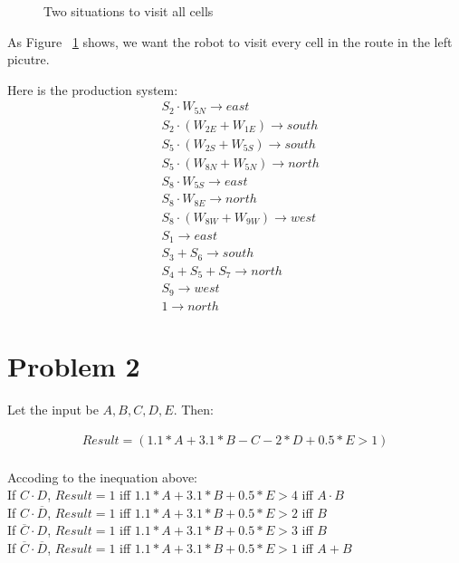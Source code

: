 \documentclass[paper=a4, fontsize=11pt]{scrartcl} %
\numberwithin{equation}{section} %
\numberwithin{figure}{section} %
\numberwithin{table}{section} %
\begin{document}
\begin{figure}[h]
    \caption{Two situations to visit all cells}
    \label{fig:Problem1.3}
\end{figure}

As Figure ~\ref{fig:Problem1.3} shows, we want the robot to visit every cell 
in the route in the left picutre.

Here is the production system:
\boldmath \begin{align*}
&S_2 \cdot W_{5N} \longrightarrow east\\
&S_2 \cdot (W_{2E} + W_{1E}) \longrightarrow south\\
&S_5 \cdot (W_{2S}+W_{5S}) \longrightarrow south\\
&S_5 \cdot (W_{8N}+W_{5N}) \longrightarrow north\\
&S_8 \cdot W_{5S} \longrightarrow east\\
&S_8 \cdot W_{8E} \longrightarrow north\\
&S_8 \cdot (W_{8W}+W_{9W}) \longrightarrow west\\
&S_1 \longrightarrow east\\
&S_3+S_6 \longrightarrow south\\
&S_4+S_5+S_7 \longrightarrow north\\
&S_9 \longrightarrow west\\
&1 \longrightarrow north
\end{align*}


\section{Problem 2}

Let the input be $A, B, C, D, E$. Then:

\begin{align*}
Result=(1.1*A+3.1*B-C-2*D+0.5*E>1)\\
\end{align*}

Accoding to the inequation above:\\
If $C \cdot D$, $Result=1$ iff $1.1*A+3.1*B+0.5*E>4$ iff $A \cdot B$\\
If $C \cdot \overline{D}$, $Result=1$ iff $1.1*A+3.1*B+0.5*E>2$ iff $B$\\
If $\overline{C} \cdot D$, $Result=1$ iff $1.1*A+3.1*B+0.5*E>3$  iff $B$\\
If $\overline{C} \cdot \overline{D}$, $Result=1$ iff $1.1*A+3.1*B+0.5*E>1$ iff $A + B$\\
\end{document}
